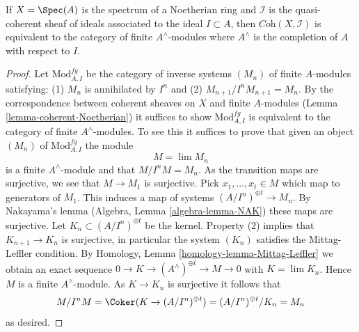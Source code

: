 \begin{lemma}
\label{lemma-inverse-systems-affine}
If $X = \Spec(A)$ is the spectrum of a Noetherian ring and
$\mathcal{I}$ is the quasi-coherent sheaf of ideals associated to the ideal
$I \subset A$, then $\textit{Coh}(X, \mathcal{I})$ is equivalent to the
category of finite $A^\wedge$-modules where $A^\wedge$ is the completion
of $A$ with respect to $I$.
\end{lemma}

\begin{proof}
Let $\text{Mod}^{fg}_{A, I}$ be the category of inverse systems $(M_n)$
of finite $A$-modules satisfying: (1) $M_n$ is annihilated by $I^n$ and (2)
$M_{n + 1}/I^nM_{n + 1} = M_n$. By the correspondence between coherent
sheaves on $X$ and finite $A$-modules (Lemma \ref{lemma-coherent-Noetherian})
it suffices to show $\text{Mod}^{fg}_{A, I}$ is equivalent to the category of
finite $A^\wedge$-modules. To see this it suffices to prove that given
an object $(M_n)$ of $\text{Mod}^{fg}_{A, I}$ the module
$$
M = \lim M_n
$$
is a finite $A^\wedge$-module and that $M/I^nM = M_n$. As the transition
maps are surjective, we see that $M \to M_1$ is surjective.
Pick $x_1, \ldots, x_t \in M$ which map to generators of $M_1$.
This induces a map of systems $(A/I^n)^{\oplus t} \to M_n$.
By Nakayama's lemma (Algebra, Lemma \ref{algebra-lemma-NAK}) these maps are
surjective. Let $K_n \subset (A/I^n)^{\oplus t}$ be the kernel.
Property (2) implies that $K_{n + 1} \to K_n$ is surjective, in particular
the system $(K_n)$ satisfies the Mittag-Leffler condition.
By Homology, Lemma \ref{homology-lemma-Mittag-Leffler}
we obtain an exact sequence
$0 \to K \to (A^\wedge)^{\oplus t} \to M \to 0$
with $K = \lim K_n$.
Hence $M$ is a finite $A^\wedge$-module.
As $K \to K_n$ is surjective it follows that
$$
M/I^nM = \Coker(K \to (A/I^n)^{\oplus t}) =
(A/I^n)^{\oplus t}/K_n = M_n
$$
as desired.
\end{proof}
